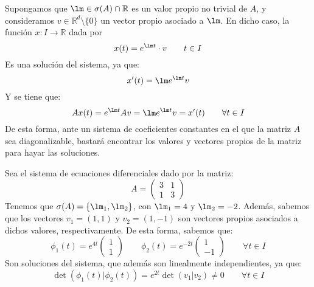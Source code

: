 Supongamos que $\lm \in \sigma(A)\cap \mathbb{R}$ es un valor propio no trivial de $A$, y consideramos $v\in \mathbb{R}^d\setminus\{0\}$ un vector propio asociado a $\lm$. En dicho caso, la función $x:I\rightarrow\mathbb{R}$ dada por
\begin{equation*}
    x(t) = e^{\lm t} \cdot v \qquad t\in I
\end{equation*}
Es una solución del sistema, ya que:
\begin{equation*}
    x'(t) = \lm e^{\lm t} v 
\end{equation*}
Y se tiene que:
\begin{equation*}
    Ax(t) = e^{\lm t} Av = \lm e^{\lm t} v = x'(t) \qquad \forall t\in I
\end{equation*}
De esta forma, ante un sistema de coeficientes constantes en el que la matriz $A$ sea diagonalizable, bastará encontrar los valores y vectores propios de la matriz para hayar las soluciones.

\begin{ejemplo}
    Sea el sistema de ecuaciones diferenciales dado por la matriz:
    \begin{equation*}
        A = \left(\begin{array}{cc}
                3 & 1 \\
                1 & 3
        \end{array}\right)
    \end{equation*}
    Tenemos que $\sigma(A) = \{\lm_1, \lm_2\}$, con $\lm_1 = 4$ y $\lm_2 = -2$. Además, sabemos que los vectores $v_1=(1, 1)$ y $v_2 = (1, -1)$ son vectores propios asociados a dichos valores, respectivamente. De esta forma, sabemos que:
    \begin{equation*}
        \phi_1(t) = e^{4t} \left(\begin{array}{c}
            1 \\
            1
        \end{array}\right) \qquad 
        \phi_2(t) = e^{-2t} \left(\begin{array}{c}
            1 \\
            -1
        \end{array}\right) \qquad \forall t\in I
    \end{equation*}
    Son soluciones del sistema, que además son linealmente independientes, ya que:
    \begin{equation*}
        \det(\phi_1(t)|\phi_2(t)) = e^{2t} \det(v_1|v_2) \neq 0 \qquad \forall t\in I
    \end{equation*}
\end{ejemplo}

